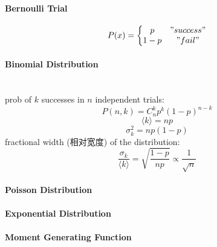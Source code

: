 \documentclass[UTF8]{ctexart} %
\numberwithin{equation}{subsection}
\begin{document}
\paragraph{Bernoulli Trial}
\begin{equation}\label{key}
P(x)=\left\{
	\mqty{p &"success"\\1-p &"fail"}\right.
\end{equation}
\paragraph{Binomial Distribution}~\\
prob of $k$ successes in $n$ independent trials:
\begin{equation}\label{key}
P(n,k)=C_n^k p^k (1-p)^{n-k}
\end{equation}
\begin{equation}\label{key}
\langle k\rangle=np
\end{equation}
\begin{equation}\label{key}
\sigma_k^2=np(1-p)
\end{equation}
fractional width (相对宽度) of the distribution:
\begin{equation}\label{key}
\dfrac{\sigma_k}{\langle k\rangle}=\sqrt{\dfrac{1-p}{np}}\propto\dfrac{1}{\sqrt{n}}
\end{equation}
\paragraph{Poisson Distribution}

\paragraph{Exponential Distribution}

\paragraph{Moment Generating Function}
\end{document}
